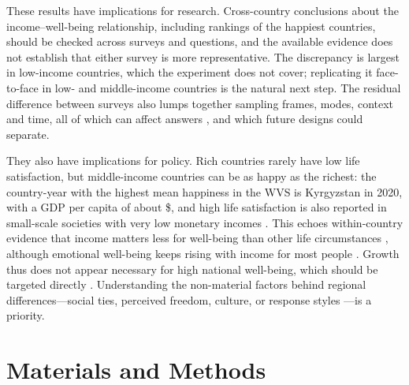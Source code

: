 \documentclass[10pt]{article}
\providecommand{\SIref}[3]{#2}
\begin{document}
These results have implications for research. Cross-country conclusions about the income--well-being relationship, including rankings of the happiest countries, should be checked across surveys and questions, and the available evidence does not establish that either survey is more representative. The discrepancy is largest in low-income countries, which the experiment does not cover; replicating it face-to-face in low- and middle-income countries is the natural next step. The residual difference between surveys also lumps together sampling frames, modes, context and time, all of which can affect answers \citep{conti_survey_2011}, and which future designs could separate.

They also have implications for policy. Rich countries rarely have low life satisfaction, but middle-income countries can be as happy as the richest: the country-year with the highest mean happiness in the WVS is Kyrgyzstan in 2020, with a GDP per capita of about \$\gdpKGZ, and high life satisfaction is also reported in small-scale societies with very low monetary incomes \citep{galbraith_high_2024}. This echoes within-country evidence that income matters less for well-being than other life circumstances \citep{helliwell_hows_2003,blanchflower_well-being_2004,kahneman_would_2006}, although emotional well-being keeps rising with income for most people \citep{killingsworth_income_2023}. %
Growth thus does not appear necessary for high national well-being, which should be targeted directly \citep{stiglitz_report_2009,frijters_happy_2020}. Understanding the non-material factors behind regional differences---social ties, perceived freedom, culture, or response styles \citep{exton_comparing_2015,senik_french_2014}---is a priority.

\section*{Materials and Methods}
\end{document}
